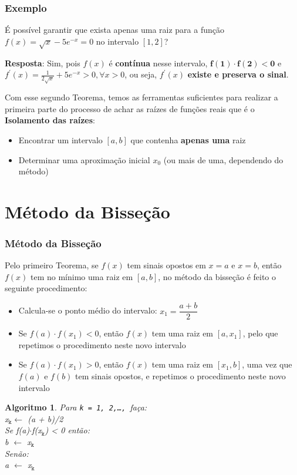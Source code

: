 \documentclass{beamer}
\theoremstyle{mystyle}
\newtheorem{algoritmo}[theorem]{Algoritmo}
\begin{document}
\begin{frame}
	\frametitle{Exemplo}
	É possível garantir que exista apenas uma raiz para a função $ f(x) = \sqrt{x} - 5e^{-x} = 0 $ no intervalo $ [1, 2] $?
	\pause
	
	\textbf{Resposta}: Sim, pois $ f(x) $ é \textbf{contínua} nesse intervalo, $ \mathbf{f(1)\cdot f(2) < 0} $ e $ f^{\prime}(x) = \frac{1}{2\sqrt{x}} + 5e^{-x} > 0, \forall x > 0 $, ou seja, $ f^{\prime} (x) $ \textbf{existe e preserva o sinal}.
\end{frame}

\begin{frame}
	Com esse segundo Teorema, temos as ferramentas suficientes para realizar a primeira parte do processo de achar as raízes de funções reais que é o \textbf{Isolamento das raízes}:
	\begin{itemize}
		\item Encontrar um intervalo $ [a, b] $ que contenha \textbf{apenas uma} raiz
		\item Determinar uma aproximação inicial $ x_{0} $ (ou mais de uma, dependendo do método)
	\end{itemize}
\end{frame}

\section{Método da Bisseção}

\begin{frame}
	\frametitle{Método da Bisseção}
	Pelo primeiro Teorema, se $ f(x) $ tem sinais opostos em $ x = a $ e $ x = b $, então $ f(x) $ tem  no mínimo uma raiz em $ [a,b] $, no método da bisseção é feito o seguinte procedimento:
	\begin{itemize}
		\item Calcula-se o ponto médio do intervalo: $ x_{1} = \dfrac{a + b}{2} $
		\item Se $ f(a) \cdot f(x_{1}) < 0 $, então $ f(x) $ tem uma raiz em $ [a, x_{1}] $, pelo que repetimos o procedimento neste novo intervalo
		\item Se $ f(a) \cdot f(x_{1}) > 0 $, então $ f(x) $ tem uma raiz em $ [x_{1}, b] $, uma vez que $ f(a) $ e $ f(b) $ tem sinais opostos, e repetimos o procedimento neste novo intervalo
	\end{itemize} 
\end{frame}

\begin{frame}
	\begin{algoritmo}
		Para \texttt{k = 1, 2,\ldots, }faça:\\
		\quad x$_{\texttt{k}} \leftarrow$ (a + b)/2\\
		\quad Se f(a)$ \cdot $f(x$ _{\texttt{k}} $) < 0 então:\\
		\quad \quad b $ \leftarrow $ x$ _{\texttt{k}} $\\
		\quad Senão:\\
		\quad \quad a $ \leftarrow $ x$ _{\texttt{k}} $
	\end{algoritmo}
\end{frame}
\end{document}
